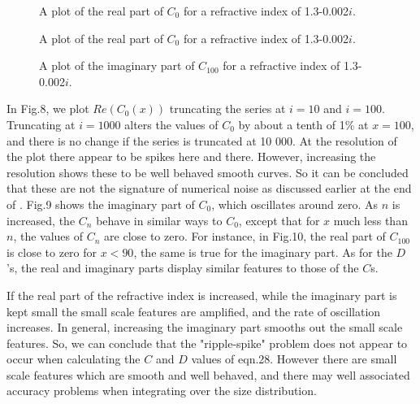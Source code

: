 \vspace*{14cm}
\begin{figure}[htb]
\caption{ A plot of the real part of $C_0$ for a refractive index of
1.3-0.002$i$. }
\end{figure}

\vspace*{14cm}
\begin{figure}[htb]
\caption{ A plot of the real part of $C_0$ for a refractive index of
1.3-0.002$i$. }
\end{figure}
\vspace*{14cm}
\begin{figure}[htb]
\caption{ A plot of the imaginary  part of $C_{100}$ for a refractive index of
1.3-0.002$i$. }
\end{figure}

In Fig.8, we plot $Re(C_0(x))$ truncating the series at $i=10$ and $i=100$.
Truncating at $i=1000$ alters the values of $C_0$ by about a tenth of 1\% at $x=100$,
and there is no change if the series is truncated at 10 000.  At the resolution
of the plot there appear to be spikes here and there. However, increasing the resolution
shows these to be well behaved smooth curves. So it can be concluded that these
are not the signature of numerical noise as discussed earlier at the end of .
 Fig.9 shows the imaginary
part of $C_0$, which oscillates around zero. As $n$ is increased, the $C_n$ behave 
in similar ways to $C_0$, except that for $x$  much less than $n$, the values of
$C_n$ are close to zero. For instance, in Fig.10, the real part of $C_{100}$ is close to zero
for $x <90$, the same is true for the imaginary part. As for the $D$'s, the real
and imaginary parts display similar features to those of the $C$s.

If the real part of the refractive index is increased, while the imaginary part is kept 
small the small scale features are amplified, and the rate of oscillation increases. In 
general, increasing the imaginary part smooths out the small scale features.
So, we can conclude that
the "ripple-spike" problem does not appear to occur when calculating the $C$ and $D$ values
of eqn.28. 
However there are small scale features which are smooth and well behaved, and there 
may well associated accuracy problems when integrating over the size distribution.

